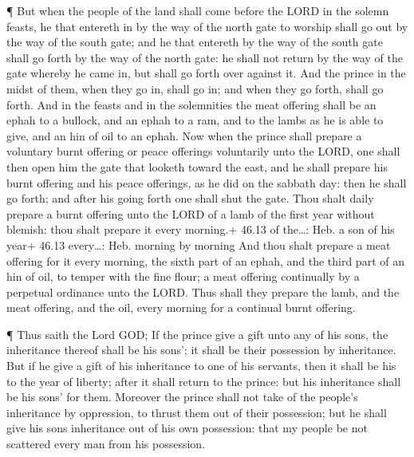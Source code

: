  ¶ But when the people of the land shall come before the
LORD in the solemn feasts, he that entereth in by the way of the north
gate to worship shall go out by the way of the south gate; and he that
entereth by the way of the south gate shall go forth by the way of the
north gate: he shall not return by the way of the gate whereby he came
in, but shall go forth over against it.  And the prince in
the midst of them, when they go in, shall go in; and when they go forth,
shall go forth.  And in the feasts and in the solemnities
the meat offering shall be an ephah to a bullock, and an ephah to a ram,
and to the lambs as he is able to give, and an hin of oil to an ephah.
 Now when the prince shall prepare a voluntary burnt
offering or peace offerings voluntarily unto the LORD, one shall then
open him the gate that looketh toward the east, and he shall prepare his
burnt offering and his peace offerings, as he did on the sabbath day:
then he shall go forth; and after his going forth one shall shut the
gate.  Thou shalt daily prepare a burnt offering unto the
LORD of a lamb of the first year without blemish: thou shalt prepare it
every morning.+ 46.13 of the\ldots: Heb. a son of his year+ 46.13
every\ldots: Heb. morning by morning  And thou shalt
prepare a meat offering for it every morning, the sixth part of an
ephah, and the third part of an hin of oil, to temper with the fine
flour; a meat offering continually by a perpetual ordinance unto the
LORD.  Thus shall they prepare the lamb, and the meat
offering, and the oil, every morning for a continual burnt offering.

 ¶ Thus saith the Lord GOD; If the prince give a gift unto
any of his sons, the inheritance thereof shall be his sons'; it shall be
their possession by inheritance.  But if he give a gift of
his inheritance to one of his servants, then it shall be his to the year
of liberty; after it shall return to the prince: but his inheritance
shall be his sons' for them.  Moreover the prince shall not
take of the people's inheritance by oppression, to thrust them out of
their possession; but he shall give his sons inheritance out of his own
possession: that my people be not scattered every man from his
possession.

